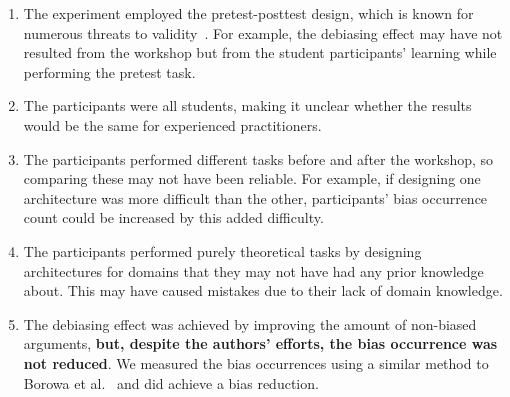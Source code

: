     \begin{enumerate}
        \item The experiment employed the pretest-posttest design, which is known for numerous threats to validity~\cite{Knapp2016}. For example, the debiasing effect may have not resulted from the workshop but from the student participants' learning while performing the pretest task.
        \item The participants were all students\color{black}, making it unclear whether the results would be the same for \color{black} experienced practitioners.
        \item The participants performed different tasks before and after the workshop, so comparing these may not have been reliable. 
        \color{black}
        For example, if designing one architecture was more difficult than the other, participants' bias occurrence count could be increased by this added difficulty. 
        \color{black}
        \item The participants performed purely theoretical tasks by designing architectures for domains that they may not have had any prior knowledge about. This may have caused mistakes due to their lack of domain knowledge.
        \color{black}
        \item The debiasing effect was achieved by improving the amount of non-biased arguments, \textbf{but, despite the authors' efforts, the bias occurrence was not reduced}. We measured the bias occurrences using a similar method to Borowa et al.~\cite{Borowa2022} and did achieve a bias reduction. 
        \color{black}
    \end{enumerate}
    
    
    
